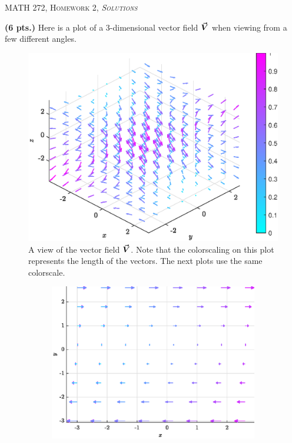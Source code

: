 \documentclass[12pt]{article} %
\begin{document}
\begin{center}
   \textsc{\large MATH 272, Homework 2, \emph{Solutions}}\\
\end{center}
\vspace{.5cm}

\begin{problem}
	\textbf{(6 pts.)} Here is a plot of a 3-dimensional vector field $\boldsymbol{\vec{V}}$ when viewing from a few different angles.
	\begin{figure}[H]
		\centering
		\includegraphics[width=.85\textwidth]{figures/vecfield}
		\caption{A view of the vector field $\boldsymbol{\vec{V}}$. Note that the colorscaling on this plot represents the length of the vectors. The next plots use the same colorscale.}
	\end{figure}
	\begin{figure}[H]
		\centering
		\begin{subfigure}[b]{0.45\textwidth}
			\centering
			\includegraphics[width=\textwidth]{figures/vecfield_xy}

\end{subfigure}
\end{figure}
\end{problem}
\end{document}
